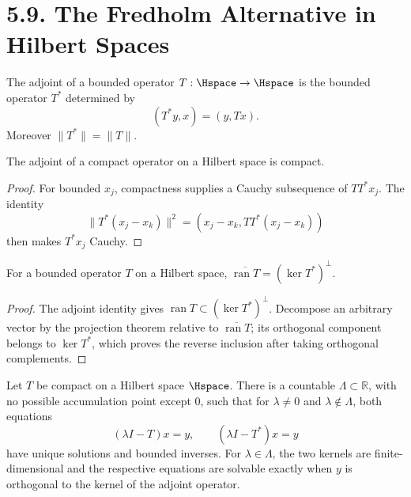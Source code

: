 \section*{5.9. The Fredholm Alternative in Hilbert Spaces}

\begin{definition}\label{gt.def5.9.adjoint-hilbert}
The adjoint of a bounded operator $T:\Hspace\to\Hspace$ is the bounded
operator $T^*$ determined by
\begin{equation}\label{gt.eq5.12}
(T^*y,x)=(y,Tx).
\end{equation}
Moreover $\|T^*\|=\|T\|$.
\end{definition}

\begin{lemma}\label{gt.lem5.9}
The adjoint of a compact operator on a Hilbert space is compact.
\end{lemma}
\begin{proof}
\sketch For bounded $x_j$, compactness supplies a Cauchy subsequence of
$TT^*x_j$. The identity
\[
\|T^*(x_j-x_k)\|^2=(x_j-x_k,TT^*(x_j-x_k))
\]
then makes $T^*x_j$ Cauchy.
\end{proof}

\begin{lemma}\label{gt.lem5.10}
For a bounded operator $T$ on a Hilbert space,
$\overline{\operatorname{ran}T}=(\ker T^*)^\perp$.
\end{lemma}
\begin{proof}
\sketch The adjoint identity gives
$\operatorname{ran}T\subset(\ker T^*)^\perp$. Decompose an arbitrary vector
by the projection theorem relative to $\overline{\operatorname{ran}T}$; its
orthogonal component belongs to $\ker T^*$, which proves the reverse
inclusion after taking orthogonal complements.
\end{proof}

\begin{theorem}\label{gt.thm5.11}
Let $T$ be compact on a Hilbert space $\Hspace$. There is a countable
$\Lambda\subset\mathbb R$, with no possible accumulation point except $0$,
such that for $\lambda\neq0$ and $\lambda\notin\Lambda$, both equations
\begin{equation}\label{gt.eq5.13}
(\lambda I-T)x=y,\qquad (\lambda I-T^*)x=y
\end{equation}
have unique solutions and bounded inverses. For $\lambda\in\Lambda$, the two
kernels are finite-dimensional and the respective equations are solvable
exactly when $y$ is orthogonal to the kernel of the adjoint operator.
\end{theorem}

